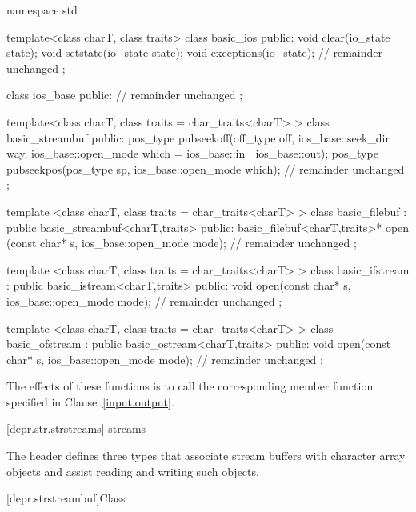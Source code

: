 \begin{codeblock}
namespace std {
  template<class charT, class traits> class basic_ios {
  public:
    void clear(io_state state);
    void setstate(io_state state);
    void exceptions(io_state);
    // remainder unchanged
  };

  class ios_base {
  public:
    // remainder unchanged
  };

  template<class charT, class traits = char_traits<charT> >
  class basic_streambuf {
  public:
    pos_type pubseekoff(off_type off, ios_base::seek_dir way,
              ios_base::open_mode which = ios_base::in | ios_base::out);
    pos_type pubseekpos(pos_type sp,
              ios_base::open_mode which);
    // remainder unchanged
  };

  template <class charT, class traits = char_traits<charT> >
  class basic_filebuf : public basic_streambuf<charT,traits> {
  public:
    basic_filebuf<charT,traits>* open
    (const char* s, ios_base::open_mode mode);
    // remainder unchanged
  };

  template <class charT, class traits = char_traits<charT> >
  class basic_ifstream : public basic_istream<charT,traits> {
  public:
    void open(const char* s, ios_base::open_mode mode);
    // remainder unchanged
  };

  template <class charT, class traits = char_traits<charT> >
  class basic_ofstream : public basic_ostream<charT,traits> {
  public:
    void open(const char* s, ios_base::open_mode mode);
    // remainder unchanged
  };
}
\end{codeblock}

\pnum
The effects of these functions is to call the corresponding member function specified
in Clause~\ref{input.output}.

[depr.str.strstreams]{ streams}

\pnum
The header
defines three types that associate stream buffers with
character array objects and assist reading and writing such objects.

[depr.strstreambuf]{Class }

